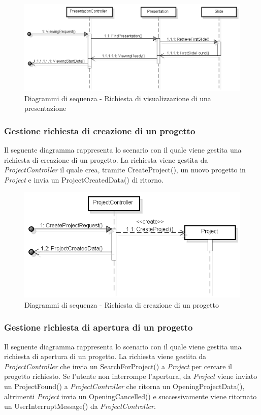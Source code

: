 \begin{figure}[H]
	\centering
	\includegraphics[scale=0.5]{img/view.png}
	\caption{Diagrammi di sequenza - Richiesta di visualizzazione di una presentazione}
\end{figure} 


\subsubsection{Gestione richiesta di creazione di un progetto}
Il seguente diagramma rappresenta lo scenario con il quale viene gestita una richiesta di creazione di un progetto. La richiesta viene gestita da \textit{ProjectController} il quale crea, tramite CreateProject(), un nuovo progetto in \textit{Project} e invia un ProjectCreatedData() di ritorno.

\begin{figure}[H]
	\centering
	\includegraphics[scale=0.5]{img/create.png}
	\caption{Diagrammi di sequenza - Richiesta di creazione di un progetto}
\end{figure}

\subsubsection{Gestione richiesta di apertura di un progetto}
Il seguente diagramma rappresenta lo scenario con il quale viene gestita una richiesta di apertura di un progetto. La richiesta viene gestita da \textit{ProjectController} che invia un SearchForProject() a \textit{Project} per cercare il progetto richiesto. Se l'utente non interrompe l'apertura, da \textit{Project} viene inviato un ProjectFound() a \textit{ProjectController} che ritorna un OpeningProjectData(), altrimenti \textit{Project} invia un OpeningCancelled() e successivamente viene ritornato un UserInterruptMessage() da \textit{ProjectController}.

